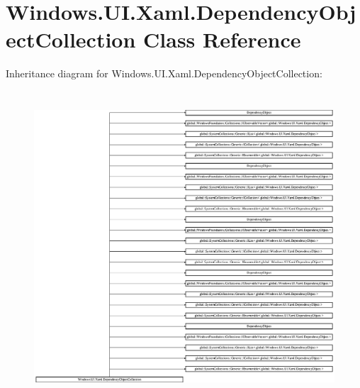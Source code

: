 \hypertarget{class_windows_1_1_u_i_1_1_xaml_1_1_dependency_object_collection}{}\section{Windows.\+U\+I.\+Xaml.\+Dependency\+Object\+Collection Class Reference}
\label{class_windows_1_1_u_i_1_1_xaml_1_1_dependency_object_collection}
Inheritance diagram for Windows.\+U\+I.\+Xaml.\+Dependency\+Object\+Collection\+:\begin{figure}[H]
\begin{center}
\leavevmode
\includegraphics[height=11.592357cm]{class_windows_1_1_u_i_1_1_xaml_1_1_dependency_object_collection}
\end{center}
\end{figure}

